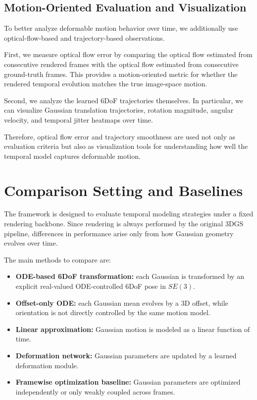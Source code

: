 \documentclass[11pt]{article}
\begin{document}
\subsection{Motion-Oriented Evaluation and Visualization}

To better analyze deformable motion behavior over time, we additionally use optical-flow-based and trajectory-based observations.

First, we measure optical flow error by comparing the optical flow estimated from consecutive rendered frames with the optical flow estimated from consecutive ground-truth frames. This provides a motion-oriented metric for whether the rendered temporal evolution matches the true image-space motion.

Second, we analyze the learned 6DoF trajectories themselves. In particular, we can visualize Gaussian translation trajectories, rotation magnitude, angular velocity, and temporal jitter heatmaps over time.

Therefore, optical flow error and trajectory smoothness are used not only as evaluation criteria but also as visualization tools for understanding how well the temporal model captures deformable motion.

\section{Comparison Setting and Baselines}

The framework is designed to evaluate temporal modeling strategies under a fixed rendering backbone. Since rendering is always performed by the original 3DGS pipeline, differences in performance arise only from how Gaussian geometry evolves over time.

The main methods to compare are:
\begin{itemize}[leftmargin=1.5em]
\item \textbf{ODE-based 6DoF transformation:} each Gaussian is transformed by an explicit real-valued ODE-controlled 6DoF pose in $SE(3)$.
\item \textbf{Offset-only ODE:} each Gaussian mean evolves by a 3D offset, while orientation is not directly controlled by the same motion model.
\item \textbf{Linear approximation:} Gaussian motion is modeled as a linear function of time.
\item \textbf{Deformation network:} Gaussian parameters are updated by a learned deformation module.
\item \textbf{Framewise optimization baseline:} Gaussian parameters are optimized independently or only weakly coupled across frames.
\end{itemize}
\end{document}
